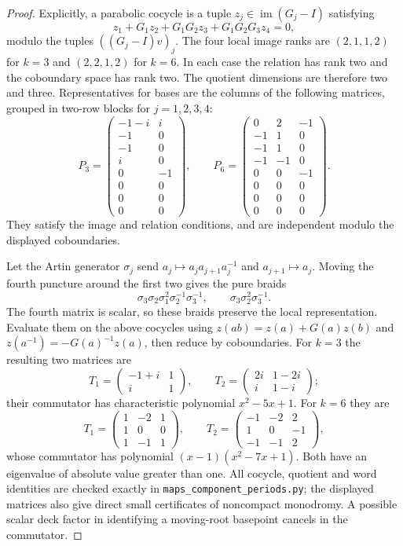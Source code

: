 \begin{proof}
Explicitly, a parabolic cocycle is a tuple
$z_j\in\operatorname{im}(G_j-I)$ satisfying
\[
 z_1+G_1z_2+G_1G_2z_3+G_1G_2G_3z_4=0,
\]
modulo the tuples $((G_j-I)v)_j$.
The four local image ranks are $(2,1,1,2)$ for $k=3$ and
$(2,2,1,2)$ for $k=6$. In each case the relation has rank two
and the coboundary space has rank two. The quotient dimensions
are therefore two and three. Representatives for bases are
the columns of the following matrices, grouped in two-row
blocks for $j=1,2,3,4$:
\[
 P_3=\begin{pmatrix}
 -1-i&i\\-1&0\\-1&0\\i&0\\0&-1\\0&0\\0&0\\0&0
 \end{pmatrix},\qquad
 P_6=\begin{pmatrix}
 0&2&-1\\-1&1&0\\-1&1&0\\-1&-1&0\\
 0&0&-1\\0&0&0\\0&0&0\\0&0&0
 \end{pmatrix}.
\]
They satisfy the image and relation conditions, and are
independent modulo the displayed coboundaries.

Let the Artin generator $\sigma_j$ send
$a_j\mapsto a_ja_{j+1}a_j^{-1}$ and
$a_{j+1}\mapsto a_j$. Moving the fourth puncture around the
first two gives the pure braids
\[
 \sigma_3\sigma_2\sigma_1^2\sigma_2^{-1}\sigma_3^{-1},
 \qquad \sigma_3\sigma_2^2\sigma_3^{-1}.
\]
The fourth matrix is scalar, so these braids preserve the
local representation. Evaluate them on the above cocycles
using $z(ab)=z(a)+G(a)z(b)$ and
$z(a^{-1})=-G(a)^{-1}z(a)$, then reduce by coboundaries.
For $k=3$ the resulting two matrices are
\[
 T_1=\begin{pmatrix}-1+i&1\\i&1\end{pmatrix},\qquad
 T_2=\begin{pmatrix}2i&1-2i\\i&1-i\end{pmatrix};
\]
their commutator has characteristic polynomial
$x^2-5x+1$. For $k=6$ they are
\[
 T_1=\begin{pmatrix}1&-2&1\\1&0&0\\1&-1&1\end{pmatrix},
 \qquad
 T_2=\begin{pmatrix}-1&-2&2\\1&0&-1\\-1&-1&2\end{pmatrix},
\]
whose commutator has polynomial $(x-1)(x^2-7x+1)$.
Both have an eigenvalue of absolute value greater than one.
All cocycle, quotient and word identities are checked exactly
in \texttt{maps\_component\_periods.py}; the displayed matrices
also give direct small certificates of noncompact monodromy.
A possible scalar deck factor in identifying a moving-root
basepoint cancels in the commutator.


\end{proof}
